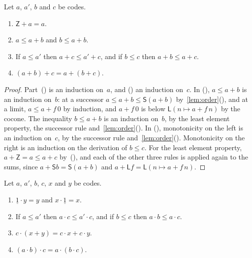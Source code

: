 \documentclass[11pt]{amsart}
\makeatletter
\newcommand{\bZ}{\mathsf{Z}}
\newcommand{\bS}{\mathsf{S}}
\newcommand{\bL}{\mathsf{L}}
\newcommand{\bplus}{\mathbin{+}}
\newcommand{\btimes}{\mathbin{\cdot}}
\newcommand{\num}[1]{\underline{#1}}          %
\newif\ifagdarefs
\newcommand{\AgdaRefs}[1]{\ifagdarefs{\footnotesize\color{agdablue}(#1)}\else\unskip\fi}
\newcommand{\Agda}[2]{{\footnotesize\color{agdablue}\textsf{#1}%
  \ifblank{#2}{}{\texttt{.}\allowbreak\texttt{#2}}}}
\let\ttt@plain\texttt
\renewcommand{\texttt}[1]{{\footnotesize\color{agdablue}\ttt@plain{#1}}}
\theoremstyle{plain}
\theoremstyle{definition}
\makeatother
\begin{document}
\begin{lemma}[Addition]
\label{lem:add}
Let $a$, $a'$, $b$ and $c$ be codes.
\begin{enumerate}
\item\label{item:Z-unit}
  $\bZ \bplus a = a$.
\item\label{item:add-incr}
  $a \le a \bplus b$ and $b \le a \bplus b$.
\item\label{item:add-mono}
  If $a \le a'$ then $a \bplus c \le a' \bplus c$, and if $b \le c$ then
  $a \bplus b \le a \bplus c$.
\item\label{item:add-assoc}
  $(a \bplus b) \bplus c = a \bplus (b \bplus c)$.
\end{enumerate}
\AgdaRefs{\Agda{BrouwerOrdinals.Epsilon0}{Z-left-unit};
\texttt{⊕-increasing-right}, \texttt{⊕-mono-right};
\Agda{BrouwerOrdinals.Multiplication}{⊕-increasing-left},
\texttt{⊕-mono-left}, \texttt{⊕-assoc}.}
\end{lemma}

\begin{proof}
Part~() is an induction on~$a$, and
() an induction on~$c$. In
(), $a \le a \bplus b$ is an induction
on~$b$: at a successor $a \le a \bplus b \le \bS(a \bplus b)$
by~\cref{lem:order}(), and at a limit,
$a \le a \bplus f\,0$ by induction, and $a \bplus f\,0$ is below
$\bL(n \mapsto a \bplus f\,n)$ by the cocone. The inequality $b \le a \bplus b$ is an induction on~$b$, by the
least element property, the successor rule
and~\cref{lem:order}(). In
(), monotonicity on the left is an induction
on~$c$, by the successor rule and~\cref{lem:order}().
Monotonicity on the right is an induction on the derivation of
$b \le c$. For the least element property,
$a \bplus \bZ = a \le a \bplus c$ by~(), and
each of the other three rules is applied again to the sums, since
$a \bplus \bS b = \bS(a \bplus b)$ and
$a \bplus \bL f = \bL(n \mapsto a \bplus f\,n)$.
\end{proof}

\begin{lemma}[Multiplication]
\label{lem:mult}
Let $a$, $a'$, $b$, $c$, $x$ and $y$ be codes.
\begin{enumerate}
\item\label{item:one-unit}
  $\num 1 \btimes y = y$ and $x \btimes \num 1 = x$.
\item\label{item:mult-mono}
  If $a \le a'$ then $a \btimes c \le a' \btimes c$, and if $b \le c$
  then $a \btimes b \le a \btimes c$.
\item\label{item:distrib}
  $c \btimes (x \bplus y) = c \btimes x \bplus c \btimes y$.
\item\label{item:mult-assoc}
  $(a \btimes b) \btimes c = a \btimes (b \btimes c)$.
\end{enumerate}
\AgdaRefs{\Agda{BrouwerOrdinals.Epsilon0}{SZ-⊗}; \texttt{⊗-mono-left},
\texttt{⊗-mono-right};
\Agda{BrouwerOrdinals.Multiplication}{⊗-left-distrib},
\texttt{⊗-assoc}.}
\end{lemma}
\end{document}
